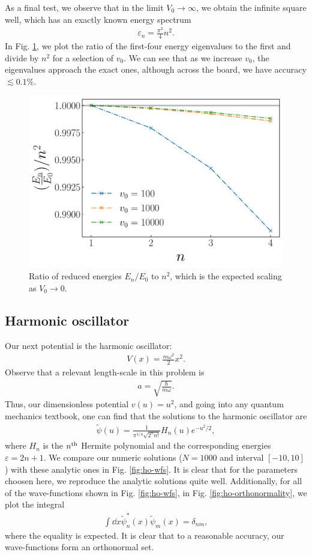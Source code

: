 As a final test, we observe that in the limit $V_0 \rightarrow \infty$, we obtain the infinite square well, which has an exactly known energy spectrum
\begin{align}
    \varepsilon_{n} = \frac{\pi^2}{4} n^2
.\end{align}
In Fig. \ref{fig:finite-well-spectrum}, we plot the ratio of the first-four energy eigenvalues to the first and divide by $n^2$ for a selection of $v_0$.
We can see that as we increase $v_0$, the eigenvalues approach the exact ones, although across the board, we have accuracy $\lesssim 0.1\%$.

\begin{figure}[h!tb]
    \centering
    \includegraphics[width=0.5\linewidth]{finite_well_spectrum.pdf}
    \caption{Ratio of reduced energies $E_{n}/E_0$ to $n^2$, which is the expected scaling as $V_0 \rightarrow 0$.}
    \label{fig:finite-well-spectrum}
\end{figure}


\subsection{Harmonic oscillator}
\label{ssec:harmonic-oscillator}

Our next potential is the harmonic oscillator:
\begin{align}
    V(x) = \frac{m \omega^2}{2} x^2
.\end{align}
Observe that a relevant length-scale in this problem is
\begin{align}
    a = \sqrt{\frac{\hbar}{m \omega}}
.\end{align}
Thus, our dimensionless potential $v(u) = u^2$, and going into any quantum mechanics textbook, one can find that the solutions to the harmonic oscillator are
\begin{align}
    \tilde{\psi}(u) = \frac{1}{\pi^{1/4} \sqrt{2^{n} n!}} H_{n}(u) e^{-u^2 / 2}
,\end{align}
where $H_{n}$ is the $n^{\rm th}$ Hermite polynomial and the corresponding energies $\varepsilon = 2n + 1$.
We compare our numeric solutions ($N = 1000$ and interval $[-10,10]$) with these analytic ones in Fig. \ref{fig:ho-wfs}.
It is clear that for the parameters choosen here, we reproduce the analytic solutions quite well.
Additionally, for all of the wave-functions shown in Fig. \ref{fig:ho-wfs}, in Fig. \ref{fig:ho-orthonormality}, we plot the integral
\begin{align}
    \int \dd{x} \tilde{\psi}_{n}^{*}(x) \tilde{\psi}_{m}(x) = \delta_{nm}
,\end{align}
where the equality is expected.
It is clear that to a reasonable accuracy, our wave-functions form an orthonormal set.

